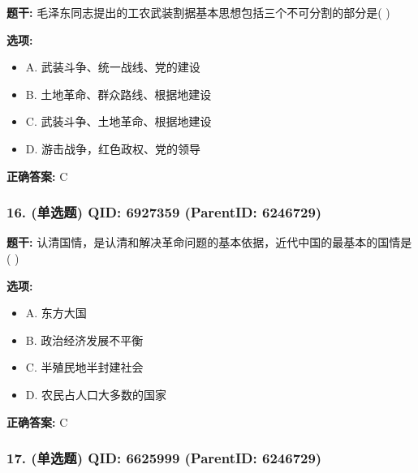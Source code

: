 \documentclass[12pt,UTF8]{ctexart}
\begin{document}
\textbf{题干:}
毛泽东同志提出的工农武装割据基本思想包括三个不可分割的部分是(   )



\textbf{选项:}
\begin{itemize}[leftmargin=*]

  \item A. 武装斗争、统一战线、党的建设

  \item B. 土地革命、群众路线、根据地建设

  \item C. 武装斗争、土地革命、根据地建设

  \item D. 游击战争，红色政权、党的领导

\end{itemize}

\textbf{正确答案:}
C

\vspace{0.3em}\hrulefill\vspace{0.7em}

\subsubsection*{16. (单选题) \small QID: 6927359 (ParentID: 6246729)}

\textbf{题干:}
认清国情，是认清和解决革命问题的基本依据，近代中国的最基本的国情是(   )



\textbf{选项:}
\begin{itemize}[leftmargin=*]

  \item A. 东方大国

  \item B. 政治经济发展不平衡

  \item C. 半殖民地半封建社会

  \item D. 农民占人口大多数的国家

\end{itemize}

\textbf{正确答案:}
C

\vspace{0.3em}\hrulefill\vspace{0.7em}

\subsubsection*{17. (单选题) \small QID: 6625999 (ParentID: 6246729)}
\end{document}
